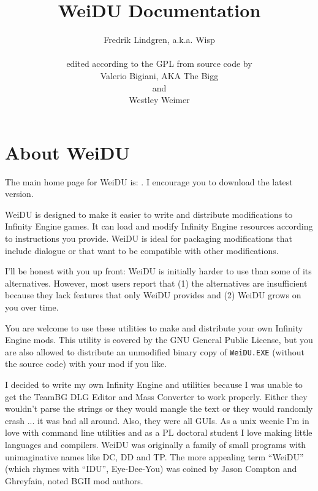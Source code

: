 \documentclass{article}
\title{WeiDU Documentation}
\author{Fredrik Lindgren, a.k.a. Wisp\\
\mailto{lindgren.fredrik@gmail.com}\\
edited according to the GPL from source code by \\
Valerio Bigiani, AKA The Bigg \\
\mailto{thebigg@spellholdstudios.net} and\\
Westley Weimer\\
\mailto{weimer@cs.berkley.edu}}
\def\ttref#1{\ahrefloc{#1}{\tt #1}}
\def\DEFINE#1{{\tt \bf #1}\label{#1}\index{#1}}
\def\t#1{{\tt #1}}
\begin{document}
\maketitle
\tableofcontents



\section{About WeiDU}

The main home page for WeiDU is:
.
I encourage you to download the latest version.

WeiDU is designed to make it easier to write and distribute modifications
to Infinity Engine games. It can load and modify Infinity Engine resources
according to instructions you provide. WeiDU is ideal for packaging
modifications that include dialogue or that want to be compatible with
other modifications.

I'll be honest with you up front: WeiDU is initially harder to use than
some of its alternatives. However, most users report that (1) the
alternatives are insufficient because they lack features that only WeiDU
provides and (2) WeiDU grows on you over time.

You are welcome to use these utilities to make and distribute your own
Infinity Engine mods. This utility is covered by the GNU General Public
License, but you are also allowed to distribute an unmodified binary copy
of \t{WeiDU.EXE} (without the source code) with your mod if you like.

I decided to write my own Infinity Engine \ttref{DLG} and \ttref{TLK}
utilities because I was unable to get the TeamBG DLG Editor and Mass
Converter to work properly. Either they wouldn't parse the strings or they
would mangle the text or they would randomly crash ... it was bad all
around. Also, they were all GUIs. As a unix weenie I'm in love with command
line utilities and as a PL doctoral student I love making little languages
and compilers.  WeiDU was originally a family of small programs with
unimaginative names like DC, DD and TP. The more appealing term ``WeiDU''
(which rhymes with ``IDU'', Eye-Dee-You) was coined by Jason Compton and
Ghreyfain, noted BGII mod authors.
\end{document}
